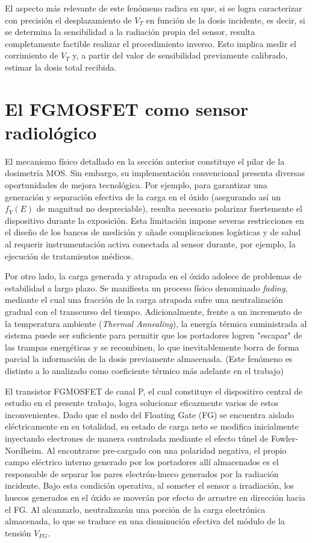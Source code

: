 \documentclass[12pt,a4paper,oneside]{book}
\begin{document}
El aspecto más relevante de este fenómeno radica en que, si se logra caracterizar con precisión el desplazamiento de $V_T$ en función de la dosis incidente, es decir, si se determina la sensibilidad a la radiación propia del sensor, resulta completamente factible realizar el procedimiento inverso. Esto implica medir el corrimiento de $V_T$ y, a partir del valor de sensibilidad previamente calibrado, estimar la dosis total recibida.

\section{El FGMOSFET como sensor radiológico}
El mecanismo físico detallado en la sección anterior constituye el pilar de la dosimetría MOS. Sin embargo, su implementación convencional presenta diversas oportunidades de mejora tecnológica. Por ejemplo, para garantizar una generación y separación efectiva de la carga en el óxido (asegurando así un $f_Y(E)$ de magnitud no despreciable), resulta necesario polarizar fuertemente el dispositivo durante la exposición. Esta limitación impone severas restricciones en el diseño de los bancos de medición y añade complicaciones logísticas y de salud al requerir instrumentación activa conectada al sensor durante, por ejemplo, la ejecución de tratamientos médicos.

Por otro lado, la carga generada y atrapada en el óxido adolece de problemas de estabilidad a largo plazo. Se manifiesta un proceso físico denominado \textit{fading}, mediante el cual una fracción de la carga atrapada sufre una neutralización gradual con el transcurso del tiempo. Adicionalmente, frente a un incremento de la temperatura ambiente (\textit{Thermal Annealing}), la energía térmica suministrada al sistema puede ser suficiente para permitir que los portadores logren "escapar" de las trampas energéticas y se recombinen, lo que inevitablemente borra de forma parcial la información de la dosis previamente almacenada. (Este fenómeno es distinto a lo analizado como coeficiente térmico más adelante en el trabajo)

El transistor FGMOSFET de canal P, el cual constituye el dispositivo central de estudio en el presente trabajo, logra solucionar eficazmente varios de estos inconvenientes. Dado que el nodo del Floating Gate (FG) se encuentra aislado eléctricamente en su totalidad, su estado de carga neto se modifica inicialmente inyectando electrones de manera controlada mediante el efecto túnel de Fowler-Nordheim. Al encontrarse pre-cargado con una polaridad negativa, el propio campo eléctrico interno generado por los portadores allí almacenados es el responsable de separar los pares electrón-hueco generados por la radiación incidente. Bajo esta condición operativa, al someter el sensor a irradiación, los huecos generados en el óxido se moverán por efecto de arrastre en dirección hacia el FG. Al alcanzarlo, neutralizarán una porción de la carga electrónica almacenada, lo que se traduce en una disminución efectiva del módulo de la tensión $V_{FG}$.
\end{document}
